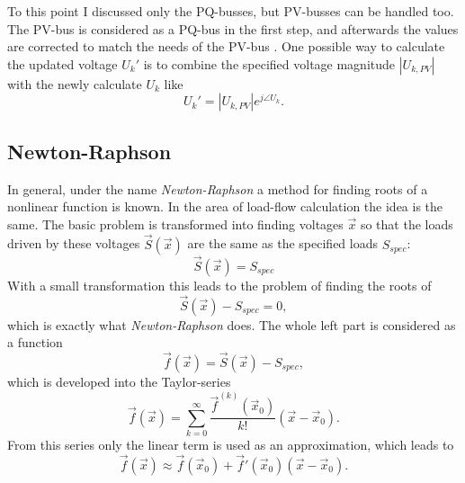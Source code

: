 To this point I discussed only the PQ-busses, but PV-busses can be handled too. The PV-bus is considered as a PQ-bus in the first step, and afterwards the values are corrected to match the needs of the PV-bus \citep[p. 211]{powerSystemAnalysis}. One possible way to calculate the updated voltage $U_k'$ is to combine the specified voltage magnitude $|U_{k,PV}|$ with the newly calculate $U_k$ like
\begin{equation}
	U_k' = |U_{k,PV}| e^{j \angle U_k}.
\end{equation}

\subsection{Newton-Raphson}
\label{sec:newton_raphson}

In general, under the name \emph{Newton-Raphson} a method for finding roots of a nonlinear function is known. In the area of load-flow calculation the idea is the same. The basic problem is transformed into finding voltages $\vec x$ so that the loads driven by these voltages $\vec S (\vec x)$ are the same as the specified loads $S_{spec}$:
\begin{equation}
	\vec S (\vec x) = S_{spec}
\end{equation}
With a small transformation this leads to the problem of finding the roots of
\begin{equation}
	\vec S (\vec x) - S_{spec} = 0,
\end{equation}
which is exactly what \emph{Newton-Raphson} does. The whole left part is considered as a function
\begin{equation}
	\vec f (\vec x) = \vec S (\vec x) - S_{spec},
\end{equation}
which is developed into the Taylor-series
\begin{equation}
	\vec f (\vec x) = \sum_{k = 0}^\infty \frac{\vec f^{(k)} (\vec x_0)}{k!} \left( \vec x - \vec x_0 \right).
\end{equation}
From this series only the linear term is used as an approximation, which leads to
\begin{equation}
	\vec f (\vec x) \approx \vec f (\vec x_0) + \vec f' (\vec x_0) \left( \vec x - \vec x_0 \right).
\end{equation}

